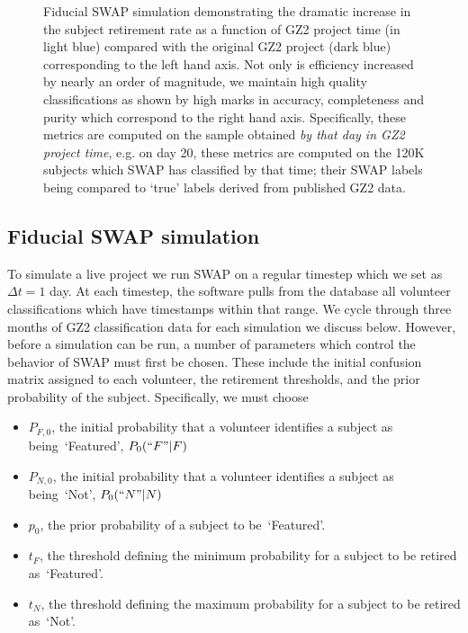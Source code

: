 \documentclass[twocolumn]{aastex6}
\newcommand{\Pf}{$P_{F,0}$}
\newcommand{\Pn}{$P_{N,0}$}
\newcommand{\p}{$p_0$}
\newcommand{\tf}{$t_F$}
\newcommand{\tn}{$t_N$}
\newcommand{\feat}{`Featured'}
\newcommand{\notfeat}{`Not'}
\begin{document}
\begin{figure}[ht!]
\caption{Fiducial SWAP simulation demonstrating the dramatic increase in the subject retirement rate as a function of GZ2 project time (in light blue) compared with the original GZ2 project (dark blue) corresponding to the left hand axis. Not only is efficiency increased by nearly an order of magnitude, we maintain high quality classifications as shown by high marks in accuracy, completeness and purity which correspond to the right hand axis.  Specifically, these metrics are computed on the sample obtained \textit{by that day in GZ2 project time}, e.g. on day 20, these metrics are computed on the 120K subjects which SWAP has classified by that time; their SWAP labels being compared to `true' labels derived from published GZ2 data. \label{fig: fiducial run}}
\end{figure}

\subsection{Fiducial SWAP simulation}

To simulate a live project we run SWAP on a regular timestep which we set as $\Delta t = 1$ day. 
At each timestep, the software pulls from the database all volunteer classifications which
have timestamps within that range. We cycle through three months of GZ2 classification data 
for each simulation we discuss below. However, before a simulation can be run, a number 
of parameters which control the behavior of SWAP must first be chosen. These include
 the initial confusion matrix assigned to each volunteer, the retirement
thresholds, and the prior probability of the subject. Specifically, we must choose 
\begin{itemize}
\item \Pf, the initial probability that a volunteer identifies a subject as being~\feat, $P_0(``F"|F)$
\item \Pn, the initial probability that a volunteer identifies a subject as being~\notfeat, $P_0(``N"|N)$
\item \p, the prior probability of a subject to be~\feat.
\item \tf, the threshold defining the minimum probability for a subject to be retired as~\feat.
\item \tn, the threshold defining the maximum probability for a subject to be retired as~\notfeat.
\end{itemize}
\end{document}
